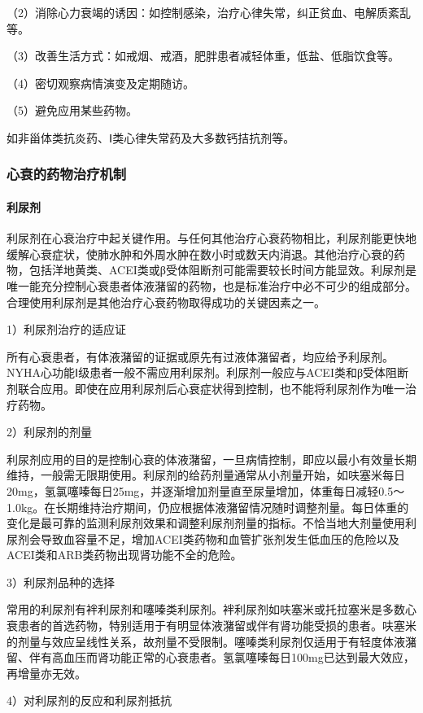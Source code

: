 （2）消除心力衰竭的诱因：如控制感染，治疗心律失常，纠正贫血、电解质紊乱等。

（3）改善生活方式：如戒烟、戒酒，肥胖患者减轻体重，低盐、低脂饮食等。

（4）密切观察病情演变及定期随访。

（5）避免应用某些药物。

如非甾体类抗炎药、Ⅰ类心律失常药及大多数钙拮抗剂等。

\subsubsection{心衰的药物治疗机制}
\paragraph{利尿剂}

利尿剂在心衰治疗中起关键作用。与任何其他治疗心衰药物相比，利尿剂能更快地缓解心衰症状，使肺水肿和外周水肿在数小时或数天内消退。其他治疗心衰的药物，包括洋地黄类、ACEI类或β受体阻断剂可能需要较长时间方能显效。利尿剂是唯一能充分控制心衰患者体液潴留的药物，也是标准治疗中必不可少的组成部分。合理使用利尿剂是其他治疗心衰药物取得成功的关键因素之一。

1）利尿剂治疗的适应证

所有心衰患者，有体液潴留的证据或原先有过液体潴留者，均应给予利尿剂。NYHA心功能Ⅰ级患者一般不需应用利尿剂。利尿剂一般应与ACEI类和β受体阻断剂联合应用。即使在应用利尿剂后心衰症状得到控制，也不能将利尿剂作为唯一治疗药物。

2）利尿剂的剂量

利尿剂应用的目的是控制心衰的体液潴留，一旦病情控制，即应以最小有效量长期维持，一般需无限期使用。利尿剂的给药剂量通常从小剂量开始，如呋塞米每日20mg，氢氯噻嗪每日25mg，并逐渐增加剂量直至尿量增加，体重每日减轻0.5～1.0kg。在长期维持治疗期间，仍应根据体液潴留情况随时调整剂量。每日体重的变化是最可靠的监测利尿剂效果和调整利尿剂剂量的指标。不恰当地大剂量使用利尿剂会导致血容量不足，增加ACEI类药物和血管扩张剂发生低血压的危险以及ACEI类和ARB类药物出现肾功能不全的危险。

3）利尿剂品种的选择

常用的利尿剂有袢利尿剂和噻嗪类利尿剂。袢利尿剂如呋塞米或托拉塞米是多数心衰患者的首选药物，特别适用于有明显体液潴留或伴有肾功能受损的患者。呋塞米的剂量与效应呈线性关系，故剂量不受限制。噻嗪类利尿剂仅适用于有轻度体液潴留、伴有高血压而肾功能正常的心衰患者。氢氯噻嗪每日100mg已达到最大效应，再增量亦无效。

4）对利尿剂的反应和利尿剂抵抗

